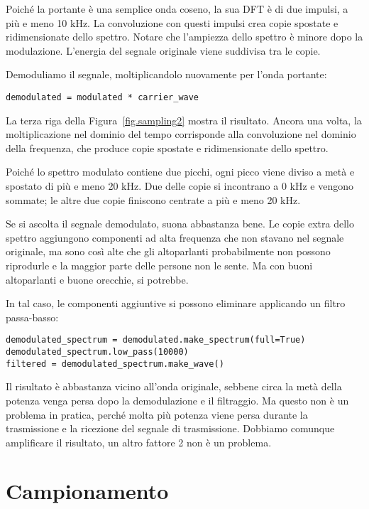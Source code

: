 \documentclass[12pt]{book} \usepackage[width=5.5in,height=8.5in, hmarginratio=3:2,vmarginratio=1:1]{geometry}
\begin{document}
Poiché la portante è una semplice onda coseno, la sua DFT è di due impulsi, a più e meno 10 kHz. La convoluzione con questi impulsi crea copie spostate e ridimensionate dello spettro. Notare che l'ampiezza dello spettro è minore dopo la modulazione. L'energia del segnale originale viene suddivisa tra le copie.

Demoduliamo il segnale, moltiplicandolo nuovamente per l'onda portante:

\begin{verbatim} 
demodulated = modulated * carrier_wave
 \end{verbatim} 

La terza riga della Figura~\ref{fig.sampling2} mostra il risultato. Ancora una volta, la moltiplicazione nel dominio del tempo corrisponde alla convoluzione nel dominio della frequenza, che produce copie spostate e ridimensionate dello spettro.

Poiché lo spettro modulato contiene due picchi, ogni picco viene diviso a metà e spostato di più e meno 20 kHz. Due delle copie si incontrano a 0 kHz e vengono sommate; le altre due copie finiscono centrate a più e meno 20 kHz.

Se si ascolta il segnale demodulato, suona abbastanza bene. Le copie extra dello spettro aggiungono componenti ad alta frequenza che non stavano nel segnale originale, ma sono così alte che gli altoparlanti probabilmente non possono riprodurle e la maggior parte delle persone non le sente. Ma con buoni altoparlanti e buone orecchie, si potrebbe.

In tal caso, le componenti aggiuntive si possono eliminare applicando un filtro passa-basso:

\begin{verbatim} 
demodulated_spectrum = demodulated.make_spectrum(full=True)
demodulated_spectrum.low_pass(10000)
filtered = demodulated_spectrum.make_wave()
 \end{verbatim} 

Il risultato è abbastanza vicino all'onda originale, sebbene circa la metà della potenza venga persa dopo la demodulazione e il filtraggio. Ma questo non è un problema in pratica, perché molta più potenza viene persa durante la trasmissione e la ricezione del segnale di trasmissione. Dobbiamo comunque amplificare il risultato, un altro fattore 2 non è un problema.

\section{Campionamento} 
\end{document}
